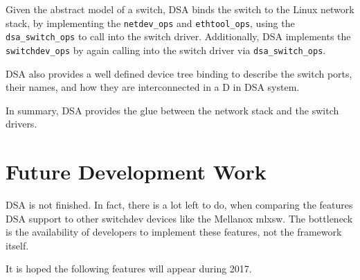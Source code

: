 \documentclass[letterpaper]{article}
\begin{document}
Given the abstract model of a switch, DSA binds the switch to the
Linux network stack, by implementing the \verb|netdev_ops| and
\verb|ethtool_ops|, using the \verb|dsa_switch_ops| to call into the
switch driver. Additionally, DSA implements the \verb|switchdev_ops|
by again calling into the switch driver via \verb|dsa_switch_ops|.

DSA also provides a well defined device tree binding to describe the
switch ports, their names, and how they are interconnected in a D in
DSA system.

In summary, DSA provides the glue between the network stack and the switch
drivers.

\section{Future Development Work}

DSA is not finished. In fact, there is a lot left to do, when
comparing the features DSA support to other switchdev devices like the
Mellanox mlxsw. The bottleneck is the availability of developers to
implement these features, not the framework itself.

It is hoped the following features will appear during 2017.
\end{document}
